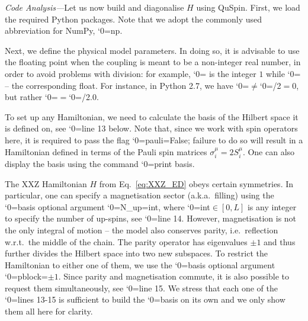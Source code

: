 \documentclass{SciPost}
\newcommand\0{\scalebox{-1}[1]{0}}
\let\svttfamily\ttfamily
\renewcommand\ttfamily{\svttfamily\catcode`0=\active }
\renewcommand\texttt{\bgroup\ttfamily\texttthelp}
\def\texttthelp#1{#1\egroup}
\begin{document}
\emph{Code Analysis---}Let us now build and diagonalise $H$ using QuSpin. First, we load the required Python packages. Note that we adopt the commonly used abbreviation for NumPy, \texttt{np}. 

%
Next, we define the physical model parameters. In doing so, it is advisable to use the floating point when the coupling is meant to be a non-integer real number, in order to avoid problems with division: for example, \texttt{1} is the integer $1$ while \texttt{1.0} -- the corresponding float. For instance, in Python 2.7, we have \texttt{0.5}$\neq$\texttt{1/2$=$0}, but rather \texttt{0.5}$=$\texttt{1.0/2.0}.  

%
To set up any Hamiltonian, we need to calculate the basis of the Hilbert space it is defined on, see \texttt{line 13} below. Note that, since we work with spin operators here, it is required to pass the flag \texttt{pauli=False}; failure to do so will result in a Hamiltonian defined in terms of the Pauli spin matrices $\sigma^\mu_i=2S^\mu_i$. One can also display the basis using the command \texttt{print basis}.

%
The XXZ Hamiltonian $H$ from Eq.~\eqref{eq:XXZ_ED} obeys certain symmetries. In particular, one can specify a magnetisation sector (a.k.a.~filling) using the \texttt{basis} optional argument \texttt{N\_up=int}, where \texttt{int$\in[0,L]$} is any integer to specify the number of up-spins, see \texttt{line 14}. However, magnetisation is not the only integral of motion -- the model also conserves parity, i.e.~reflection w.r.t.~the middle of the chain. The parity operator has eigenvalues $\pm1$ and thus further divides the Hilbert space into two new subspaces. To restrict the Hamiltonian to either one of them, we use the \texttt{basis} optional argument \texttt{pblock=$\pm1$}. Since parity and magnetisation commute, it is also possible to request them simultaneously, see \texttt{line 15}. We stress that each one of the \texttt{lines 13-15} is sufficient to build the \texttt{basis} on its own and we only show them all here for clarity.

% 
\end{document}
